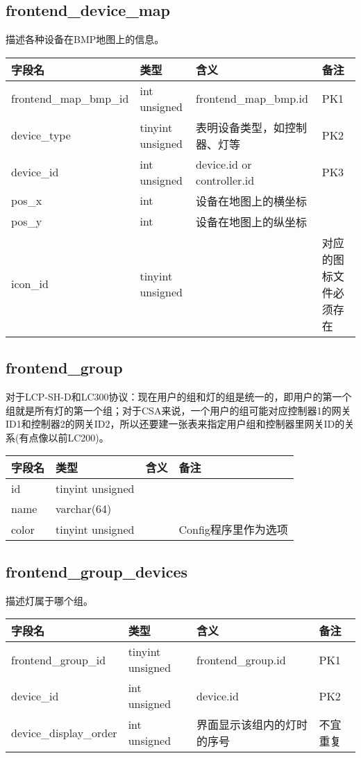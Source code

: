 \subsection{frontend\_device\_map}\label{frontendux5fdeviceux5fmap}

描述各种设备在BMP地图上的信息。

\begin{longtabu}[c]{@{}lXXX@{}}
\toprule
字段名 & 类型 & 含义 & 备注\tabularnewline
\midrule
\endhead
frontend\_map\_bmp\_id & int unsigned & frontend\_map\_bmp.id &
PK1\tabularnewline
device\_type & tinyint unsigned & 表明设备类型，如控制器、灯等 &
PK2\tabularnewline
device\_id & int unsigned & device.id or controller.id &
PK3\tabularnewline
pos\_x & int & 设备在地图上的横坐标 &\tabularnewline
pos\_y & int & 设备在地图上的纵坐标 &\tabularnewline
icon\_id & tinyint unsigned & & 对应的图标文件必须存在\tabularnewline
\bottomrule
\end{longtabu}

\subsection{frontend\_group}\label{frontendux5fgroup}

对于LCP-SH-D和LC300协议：现在用户的组和灯的组是统一的，即用户的第一个组就是所有灯的第一个组；对于CSA来说，一个用户的组可能对应控制器1的网关ID1和控制器2的网关ID2，所以还要建一张表来指定用户组和控制器里网关ID的关系(有点像以前LC200)。

\begin{longtabu}[c]{@{}lXXX@{}}
\toprule
字段名 & 类型 & 含义 & 备注\tabularnewline
\midrule
\endhead
id & tinyint unsigned & &\tabularnewline
name & varchar(64) & &\tabularnewline
color & tinyint unsigned & & Config程序里作为选项\tabularnewline
\bottomrule
\end{longtabu}

\subsection{frontend\_group\_devices}\label{frontendux5fgroupux5fdevices}

描述灯属于哪个组。

\begin{longtabu}[c]{@{}lXXX@{}}
\toprule
字段名 & 类型 & 含义 & 备注\tabularnewline
\midrule
\endhead
frontend\_group\_id & tinyint unsigned & frontend\_group.id &
PK1\tabularnewline
device\_id & int unsigned & device.id & PK2\tabularnewline
device\_display\_order & int unsigned & 界面显示该组内的灯时的序号 &
不宜重复\tabularnewline
\bottomrule
\end{longtabu}

